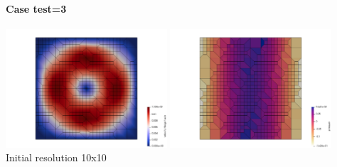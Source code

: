 \paragraph{Case test=3}

\begin{center}
\includegraphics[width=6cm]{python_codes/fieldstone_102/results/test3/vel}
\includegraphics[width=6cm]{python_codes/fieldstone_102/results/test3/press}\\
{\captionfont Initial resolution 10x10}
\end{center}
















